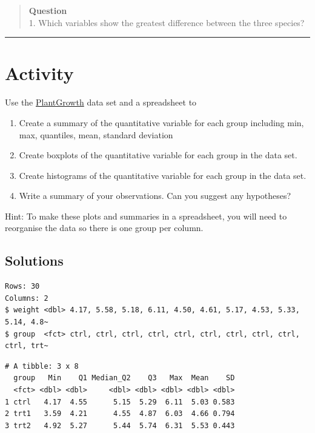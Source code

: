 \documentclass[
]{book}
\providecommand{\tightlist}{%
  \setlength{\itemsep}{0pt}\setlength{\parskip}{0pt}}
\begin{document}
\begin{quote}
\textbf{Question}\\
1. Which variables show the greatest difference between the three species?
\end{quote}

\begin{center}\rule{0.5\linewidth}{0.5pt}\end{center}

\section{Activity}\label{activity-3}

Use the \href{resources/datasets/PlantGrowth.csv}{PlantGrowth} data set and a spreadsheet to

\begin{enumerate}
\def\labelenumi{\arabic{enumi}.}
\tightlist
\item
  Create a summary of the quantitative variable for each group including min, max, quantiles, mean, standard deviation
\item
  Create boxplots of the quantitative variable for each group in the data set.
\item
  Create histograms of the quantitative variable for each group in the data set.
\item
  Write a summary of your observations. Can you suggest any hypotheses?
\end{enumerate}

Hint: To make these plots and summaries in a spreadsheet, you will need to reorganise the data so there is one group per column.

\subsection{Solutions}\label{solutions}

\begin{verbatim}
Rows: 30
Columns: 2
$ weight <dbl> 4.17, 5.58, 5.18, 6.11, 4.50, 4.61, 5.17, 4.53, 5.33, 5.14, 4.8~
$ group  <fct> ctrl, ctrl, ctrl, ctrl, ctrl, ctrl, ctrl, ctrl, ctrl, ctrl, trt~
\end{verbatim}

\begin{verbatim}
# A tibble: 3 x 8
  group   Min    Q1 Median_Q2    Q3   Max  Mean    SD
  <fct> <dbl> <dbl>     <dbl> <dbl> <dbl> <dbl> <dbl>
1 ctrl   4.17  4.55      5.15  5.29  6.11  5.03 0.583
2 trt1   3.59  4.21      4.55  4.87  6.03  4.66 0.794
3 trt2   4.92  5.27      5.44  5.74  6.31  5.53 0.443
\end{verbatim}
\end{document}
